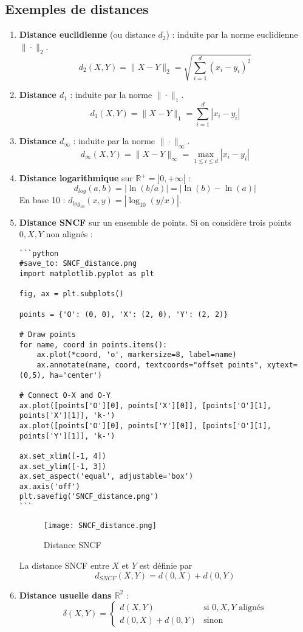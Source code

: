\subsection{Exemples de distances}

\begin{enumerate}
    \item \textbf{Distance euclidienne} (ou distance $d_2$) : induite par la norme euclidienne $\|\cdot\|_2$.
    \[
    d_2(X, Y) = \|X - Y\|_2 = \sqrt{\sum_{i=1}^d (x_i - y_i)^2}
    \]
    \item \textbf{Distance $d_1$} : induite par la norme $\|\cdot\|_1$.
    \[
    d_1(X, Y) = \|X - Y\|_1 = \sum_{i=1}^d |x_i - y_i|
    \]
    \item \textbf{Distance $d_\infty$} : induite par la norme $\|\cdot\|_\infty$.
    \[
    d_\infty(X, Y) = \|X - Y\|_\infty = \max_{1 \leq i \leq d} |x_i - y_i|
    \]
    \item \textbf{Distance logarithmique} sur $\mathbb{R}^+ = ]0, +\infty[$ :
    \[
    d_{log}(a, b) = |\ln(b/a)| = |\ln(b) - \ln(a)|
    \]
    En base 10 : $d_{log_{10}}(x, y) = |\log_{10}(y/x)|$.

    \item \textbf{Distance SNCF} sur un ensemble de points. Si on considère trois points $0, X, Y$ non alignés :

\begin{verbatim}
```python
#save_to: SNCF_distance.png
import matplotlib.pyplot as plt

fig, ax = plt.subplots()

points = {'O': (0, 0), 'X': (2, 0), 'Y': (2, 2)}

# Draw points
for name, coord in points.items():
    ax.plot(*coord, 'o', markersize=8, label=name)
    ax.annotate(name, coord, textcoords="offset points", xytext=(0,5), ha='center')

# Connect O-X and O-Y
ax.plot([points['O'][0], points['X'][0]], [points['O'][1], points['X'][1]], 'k-')
ax.plot([points['O'][0], points['Y'][0]], [points['O'][1], points['Y'][1]], 'k-')

ax.set_xlim([-1, 4])
ax.set_ylim([-1, 3])
ax.set_aspect('equal', adjustable='box')
ax.axis('off')
plt.savefig('SNCF_distance.png')
```
\end{verbatim}

\begin{figure}[H]
    \centering
    \texttt{[image: SNCF\_distance.png]}
    \caption{Distance SNCF}
    \label{fig:sncf_distance}
\end{figure}
    La distance SNCF entre $X$ et $Y$ est définie par
    \[
    d_{SNCF}(X, Y) = d(0, X) + d(0, Y)
    \]

    \item \textbf{Distance usuelle dans $\mathbb{R}^2$} :
    \[
    \delta(X, Y) =
    \begin{cases}
        d(X, Y) & \text{si } 0, X, Y \text{ alignés} \\
        d(0, X) + d(0, Y) & \text{sinon}
    \end{cases}
    \]
\end{enumerate}


